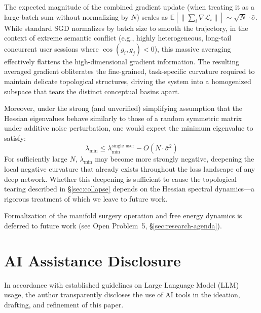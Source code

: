 \documentclass{article}
\begin{document}
The expected magnitude of the combined gradient update (when treating it as a large-batch sum without normalizing by $N$) scales as $\mathbb{E}[\|\sum_i \nabla \mathcal{L}_i\|] \sim \sqrt{N} \cdot \bar{\sigma}$. While standard SGD normalizes by batch size to smooth the trajectory, in the context of extreme semantic conflict (e.g., highly heterogeneous, long-tail concurrent user sessions where $\cos(g_i, g_j) < 0$), this massive averaging effectively flattens the high-dimensional gradient information. The resulting averaged gradient obliterates the fine-grained, task-specific curvature required to maintain delicate topological structures, driving the system into a homogenized subspace that tears the distinct conceptual basins apart.

Moreover, under the strong (and unverified) simplifying assumption that the Hessian eigenvalues behave similarly to those of a random symmetric matrix under additive noise perturbation, one would expect the minimum eigenvalue to satisfy:
\begin{equation}
\lambda_{\min} \leq \lambda_{\min}^{\text{single user}} - O(N \cdot \bar{\sigma}^2)
\end{equation}
For sufficiently large $N$, $\lambda_{\min}$ may become more strongly negative, deepening the local negative curvature that already exists throughout the loss landscape of any deep network. Whether this deepening is sufficient to cause the topological tearing described in \S\ref{sec:collapse} depends on the Hessian spectral dynamics---a rigorous treatment of which we leave to future work.

Formalization of the manifold surgery operation and free energy dynamics is deferred to future work (see Open Problem~5, \S\ref{sec:research-agenda}).

\section*{AI Assistance Disclosure}
\label{app:ai-disclosure}

In accordance with established guidelines on Large Language Model (LLM) usage, the author transparently discloses the use of AI tools in the ideation, drafting, and refinement of this paper. 
\end{document}
